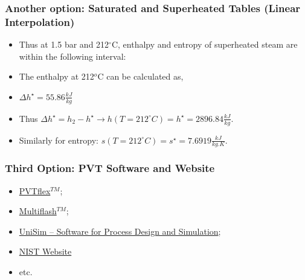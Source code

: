 \documentclass[10pt,compress]{beamer}
\begin{document}
\begin{frame}
  \frametitle{Another option: Saturated and Superheated Tables (Linear Interpolation)}
\noindent
\begin{itemize}
\item <1-> Thus at 1.5 bar and 212$^{\circ}$C, enthalpy and entropy of superheated steam are within the following interval:
\item<2-> The enthalpy at 212$^{o}$C can be calculated as,
\item <4-> $\Delta h^{\star}=55.86\frac{kJ}{kg}$ 
\item <4-> Thus $\Delta h^{\star}= h_{2}-h^{\star} \longrightarrow h\left(T=212^{\circ}C\right)=h^{\star}=2896.84\frac{kJ}{kg}$.
\item<5-> Similarly for entropy: $s\left(T=212^{\circ}C\right)=s^{\star}=7.6919\frac{kJ}{kg.K}$.
\end{itemize}

\end{frame}


\begin{frame}
  \frametitle{Third Option: PVT Software and Website}
\noindent
\begin{itemize}
   \item<1-> \href{http://www.weatherford.com/doc/wft183650}{PVTflex$^{TM}$};
   \item<1-> \href{http://www.kbcat.com/infochem-software/flow-assurance-software-multiflash/pvt-simulation}{Multiflash$^{TM}$};
   \item<1-> \href{https://www.honeywellprocess.com/en-US/explore/products/advanced-applications/unisim/Pages/default.aspx}{UniSim – Software for Process Design and Simulation};
   \item<1-> \href{http://webbook.nist.gov/chemistry/fluid/}{NIST Website}
   \item<1-> etc.
\end{itemize}

\end{frame}
\end{document}
